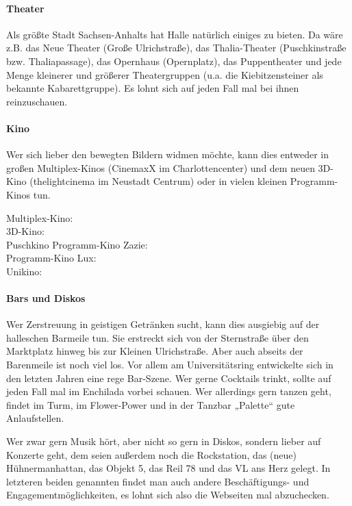 \paragraph{Theater}
Als größte Stadt Sachsen-Anhalts hat Halle natürlich einiges zu bieten.
Da wäre z.B. das Neue Theater (Große Ulrichstraße), das Thalia-Theater (Puschkinstraße bzw. Thaliapassage), das Opernhaus (Opernplatz), das Puppentheater und jede Menge kleinerer und größerer Theatergruppen (\;u.a. die Kiebitzensteiner als bekannte Kabarettgruppe).
Es lohnt sich auf jeden Fall mal bei ihnen reinzuschauen.

\paragraph{Kino}
Wer sich lieber den bewegten Bildern widmen möchte, kann dies entweder in großen Multiplex-Kinos (CinemaxX im Charlottencenter) und dem neuen 3D-Kino (thelightcinema im Neustadt Centrum) oder in vielen kleinen Programm-Kinos tun.

Multiplex-Kino: \\
3D-Kino: \\
Puschkino 
Programm-Kino Zazie: \\
Programm-Kino Lux: \\
Unikino: 


\paragraph{Bars und Diskos}
Wer Zerstreuung in geistigen Getränken sucht, kann dies ausgiebig auf der halleschen Barmeile tun.
Sie erstreckt sich von der Sternstraße über den Marktplatz hinweg bis zur Kleinen Ulrichstraße.
Aber auch abseits der Barenmeile ist noch viel los.
Vor allem am Universitätsring entwickelte sich in den letzten Jahren eine rege Bar-Szene.
Wer gerne Cocktails trinkt, sollte auf jeden Fall mal im Enchilada vorbei schauen.
Wer allerdings gern tanzen geht, findet im Turm, im Flower-Power und in der Tanzbar „Palette“ gute Anlaufstellen.

Wer zwar gern Musik hört, aber nicht so gern in Diskos, sondern lieber auf Konzerte geht, dem seien außerdem noch die Rockstation, das (neue) Hühnermanhattan, das Objekt 5, das Reil 78 und das VL ans Herz gelegt.
In letzteren beiden genannten findet man auch andere Beschäftigungs- und Engagementmöglichkeiten, es lohnt sich also die Webseiten mal abzuchecken.

